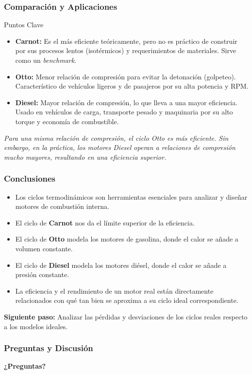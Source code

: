 \documentclass{beamer}
\begin{document}
\begin{frame}
    \frametitle{Comparación y Aplicaciones}
    
    \begin{block}{Puntos Clave}
        \begin{itemize}
            \item \textbf{Carnot:} Es el más eficiente teóricamente, pero \alert{no es práctico} de construir por sus procesos lentos (isotérmicos) y requerimientos de materiales. Sirve como un \textit{benchmark}.
            \item \textbf{Otto:} Menor relación de compresión para evitar la detonación (golpeteo). Característico de vehículos ligeros y de pasajeros por su alta potencia y RPM.
            \item \textbf{Diesel:} Mayor relación de compresión, lo que lleva a una mayor eficiencia. Usado en vehículos de carga, transporte pesado y maquinaria por su alto torque y economía de combustible.
        \end{itemize}
    \end{block}
    
    \begin{center}
        \textit{Para una misma relación de compresión, el ciclo Otto es más eficiente. Sin embargo, en la práctica, los motores Diesel operan a relaciones de compresión mucho mayores, resultando en una eficiencia superior.}
    \end{center}
\end{frame}

\begin{frame}
    \frametitle{Conclusiones}
    
    \begin{itemize}
        \item Los ciclos termodinámicos son herramientas esenciales para analizar y diseñar motores de combustión interna.
        \item El ciclo de \textbf{Carnot} nos da el límite superior de la eficiencia.
        \item El ciclo de \textbf{Otto} modela los motores de gasolina, donde el calor se añade a volumen constante.
        \item El ciclo de \textbf{Diesel} modela los motores diésel, donde el calor se añade a presión constante.
        \item La \alert{eficiencia} y el \alert{rendimiento} de un motor real están directamente relacionados con qué tan bien se aproxima a su ciclo ideal correspondiente.
    \end{itemize}
    
    \vspace{1cm}
    \centering
    \textbf{Siguiente paso:} Analizar las pérdidas y desviaciones de los ciclos reales respecto a los modelos ideales.
\end{frame}

\begin{frame}
    \frametitle{Preguntas y Discusión}
    \begin{center}
        \Huge\bfseries
        ¿Preguntas?
    \end{center}
\end{frame}
\end{document}
